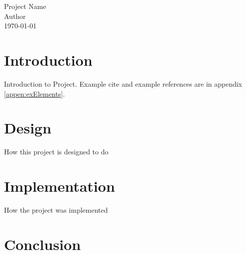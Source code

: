 \documentclass[12pt]{article}
\numberwithin{equation}{section} %
\numberwithin{figure}{section} %
\numberwithin{table}{section} %
\begin{document}

\pagestyle{empty} 
\vspace*{8cm}
\begin{center}
\Huge
Project Name \\
\vspace{5mm}
\Large
Author \\
\vspace{5mm}
\normalsize
\today
\end{center}


\newpage
\pagestyle{plain}
\tableofcontents


\newpage
{}
\pagestyle{plain}
\setcounter{page}{1}

\section{Introduction}

Introduction to Project. Example cite \cite{sigTB} and example references are in appendix \ref{appen:exElements}.\\

\newpage
\section{Design}

How this project is designed to do

\newpage
\section{Implementation}

How the project was implemented \\


\newpage
\section{Conclusion} 
\end{document}
